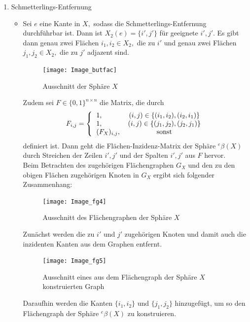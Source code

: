 \documentclass[12pt,titlepage,twoside,cleardoublepage]{article}
\theoremstyle{nummermitklammern}
\numberwithin{equation}{section}
\begin{document}
\begin{enumerate}
\item Schmetterlings-Entfernung
\begin{itemize}
\item Sei $e$ eine Kante in $X,$ sodass die Schmetterlings-Entfernung durchführbar ist. Dann ist $X_2(e)=\{i',j'\}$ für geeignete $i',j'.$ Es gibt dann genau zwei Flächen $i_1,i_2\in X_2,$ die zu $i'$ und genau zwei Flächen $j_1,j_2\in X_2,$ die zu $j'$ adjazent sind. 
\begin{figure}[H]
\begin{center}
\texttt{[image: Image\_butfac]}
\end{center}
\caption{Ausschnitt der Sphäre $X$}
\end{figure}
Zudem sei $F\in \{0,1\}^{n\times n}$ die Matrix, die durch
 \[
F_{i,j}=
\Biggl{\{\begin{tabular}[l]{lcr}
1,&\textcolor{black}{$(i,j)\in \{(i_1,i_2),(i_2,i_1)\}$} \\
1,&\textcolor{black}{$(i,j)\in \{(j_1,j_2),(j_2,j_1)\}$} \\
$(F_{X})_{i,j}$,& sonst\\
\end{tabular}}
\] definiert ist. Dann geht die Flächen-Inzidenz-Matrix der Sphäre ${}^e\beta(X)$ durch Streichen der Zeilen $i',j'$ und der Spalten $i',j'$ aus $F$ hervor.\\
Beim Betrachten des zugehörigen Flächengraphen $G_X$ und den zu den obigen Flächen zugehörigen Knoten in $G_X$ ergibt sich folgender Zusammenhang:
\begin{figure}[H]
\begin{center}
\texttt{[image: Image\_fg4]}
\end{center}
\caption{Ausschnitt des Flächengraphen der Sphäre $X$}
\end{figure}
Zunächst werden die zu $i'$ und $j'$ zugehörigen Knoten und damit auch die inzidenten Kanten aus dem Graphen entfernt. 
\begin{figure}[H]
\begin{center}
\texttt{[image: Image\_fg5]}
\end{center}
\caption{Ausschnitt eines aus dem Flächengraph der Sphäre $X$ konstruierten Graph}
\end{figure}
Daraufhin werden die Kanten $\{i_1,i_2\}$ und $\{j_1,j_2\}$ hinzugefügt, um so den Flächengraph der Sphäre ${}^e\beta(X)$ zu konstruieren. 
\begin{figure}[H]
\begin{center}

\end{center}
\end{figure}
\end{itemize}
\end{enumerate}
\end{document}
